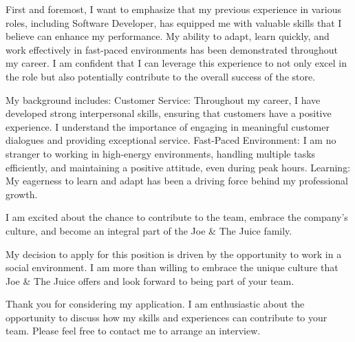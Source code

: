 \documentclass[../main.tex]{subfiles}
\begin{document}
\begin{cvletter}
\begin{cvletter}
First and foremost, I want to emphasize that my previous experience in various roles, including Software Developer, has equipped me with valuable skills that I believe can enhance my performance. My ability to adapt, learn quickly, and work effectively in fast-paced environments has been demonstrated throughout my career. I am confident that I can leverage this experience to not only excel in the role but also potentially contribute to the overall success of the store.

My background includes:
Customer Service: Throughout my career, I have developed strong interpersonal skills, ensuring that customers have a positive experience. I understand the importance of engaging in meaningful customer dialogues and providing exceptional service.
Fast-Paced Environment: I am no stranger to working in high-energy environments, handling multiple tasks efficiently, and maintaining a positive attitude, even during peak hours.
Learning: My eagerness to learn and adapt has been a driving force behind my professional growth.

I am excited about the chance to contribute to the team, embrace the company’s culture, and become an integral part of the Joe \& The Juice family.

My decision to apply for this position is driven by the opportunity to work in a social environment. I am more than willing to embrace the unique culture that Joe \& The Juice offers and look forward to being part of your team.

Thank you for considering my application. I am enthusiastic about the opportunity to discuss how my skills and experiences can contribute to your team. Please feel free to contact me to arrange an interview.

\end{cvletter}

\makeletterclosing

\vspace*{\fill}

\end{cvletter}
\end{document}
